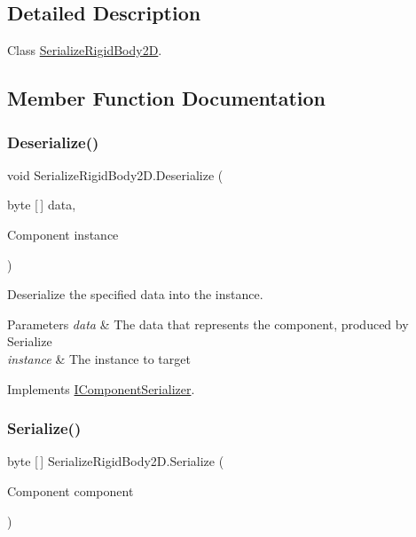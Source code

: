 \subsection{Detailed Description}
Class \hyperlink{class_serialize_rigid_body2_d}{Serialize\+Rigid\+Body2D}. 



\subsection{Member Function Documentation}
\mbox{\label{class_serialize_rigid_body2_d_ae143c153be5caaaa898e0d7e2951fbd2}} 
\subsubsection{\texorpdfstring{Deserialize()}{Deserialize()}}
{\footnotesize\ttfamily void Serialize\+Rigid\+Body2\+D.\+Deserialize (\begin{DoxyParamCaption}\item[{byte \mbox{[}$\,$\mbox{]}}]{data,  }\item[{Component}]{instance }\end{DoxyParamCaption})\hspace{0.3cm}{\ttfamily [inline]}}



Deserialize the specified data into the instance. 


\begin{DoxyParams}{Parameters}
{\em data} & The data that represents the component, produced by Serialize\\
\hline
{\em instance} & The instance to target\\
\hline
\end{DoxyParams}


Implements \hyperlink{interface_i_component_serializer_a4cc366a5c78b33d47a90c209d8fed883}{I\+Component\+Serializer}.

\mbox{\label{class_serialize_rigid_body2_d_a40d4ecd6dc6a136cb123fbb76d6ead00}} 
\subsubsection{\texorpdfstring{Serialize()}{Serialize()}}
{\footnotesize\ttfamily byte \mbox{[}$\,$\mbox{]} Serialize\+Rigid\+Body2\+D.\+Serialize (\begin{DoxyParamCaption}\item[{Component}]{component }\end{DoxyParamCaption})\hspace{0.3cm}{\ttfamily [inline]}}



